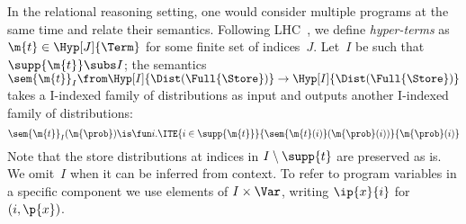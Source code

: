 In the relational reasoning setting, one would consider multiple
programs at the same time and relate their semantics.
Following LHC~\cite{d2022proving},
we define \emph{hyper-terms} as $ \m{t} \in \Hyp[J]{\Term} $
for some finite set of indices~$J$.
Let~$I$ be such that~$\supp{\m{t}} \subs I$; the semantics
$
  \sem{\m{t}}_I \from
      \Hyp[I]{\Dist(\Full{\Store})} \to \Hyp[I]{\Dist(\Full{\Store})}
$
takes a \pre I-indexed family of distributions as input and outputs
another \pre I-indexed family of distributions:
\[
  \sem{\m{t}}_I(\m{\prob}) \is
    \fun i.
    \ITE{i \in \supp{\m{t}}}{
      \sem{\m{t}(i)}(\m{\prob}(i))
    }{
      \m{\prob}(i)
    }
\]
Note that the store distributions at indices in $ I \setminus \supp{t} $
are preserved as is.
We omit~$I$ when it can be inferred from context.
To refer to program variables in a specific component we use
elements of $I\times \Var$, writing $\ip{x}{i}$ for $(i,\p{x})$.

